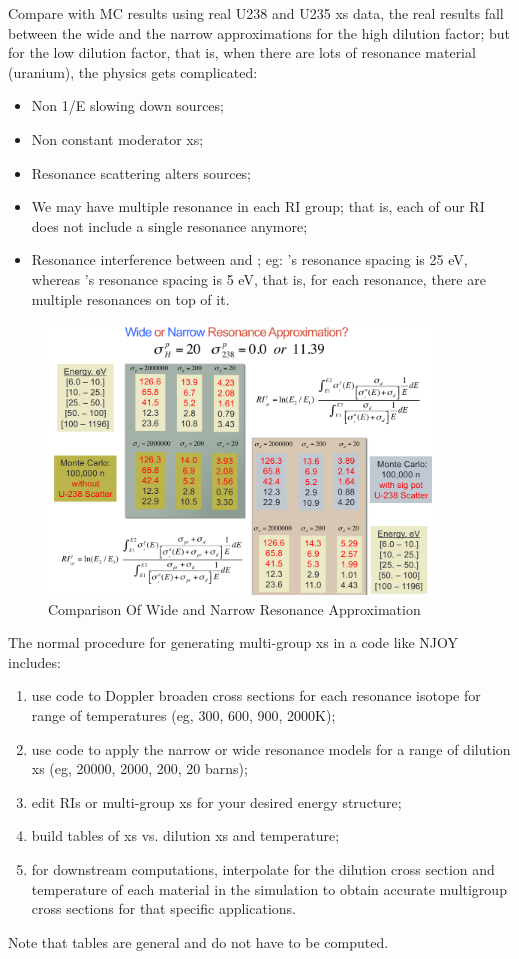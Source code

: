 \documentclass{school-22.211-notes}
\begin{document}
Compare with MC results using real U238 and U235 xs data, the real results fall between the wide and the narrow approximations for the high dilution factor; but for the low dilution factor, that is, when there are lots of resonance material (uranium), the physics gets complicated: 
\begin{itemize}
\item Non 1/E slowing down sources;
\item Non constant moderator xs;
\item Resonance scattering alters sources;
\item We may have multiple resonance in each RI group; that is, each of our RI does not include a single resonance anymore;
\item Resonance interference between  and ; eg: 's resonance spacing is 25 eV, whereas 's resonance spacing is 5 eV, that is, for each  resonance, there are multiple  resonances on top of it. 
\end{itemize}

\begin{figure}
  \centering
  \includegraphics[width=4in]{images/narrow-vs-wide-resonance.png}
  \caption{Comparison Of Wide and Narrow Resonance Approximation} \label{wide-vs-narrow}
\end{figure}



The normal procedure for generating multi-group xs in a code like NJOY includes:
\begin{enumerate}
\item use code to Doppler broaden cross sections for each resonance isotope for range of temperatures (eg, 300, 600, 900, 2000K); 
\item use code to apply the narrow or wide resonance models for a range of dilution xs (eg, 20000, 2000, 200, 20 barns); 
\item edit RIs or multi-group xs for your desired energy structure; 
\item build tables of xs vs. dilution xs and temperature;
\item for downstream computations, interpolate for the dilution cross section and temperature of each material in the simulation to obtain accurate multigroup cross sections for that specific applications. 
\end{enumerate}
Note that tables are general and do not have to be computed. 
\end{document}
